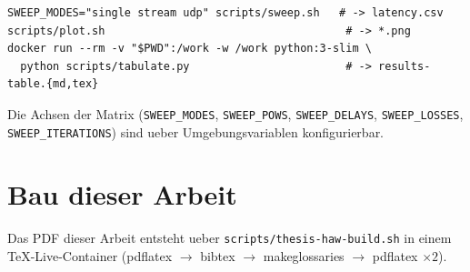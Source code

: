 \begin{lstlisting}[caption={Sweep, Abbildungen und Tabellen.}]
SWEEP_MODES="single stream udp" scripts/sweep.sh   # -> latency.csv
scripts/plot.sh                                     # -> *.png
docker run --rm -v "$PWD":/work -w /work python:3-slim \
  python scripts/tabulate.py                        # -> results-table.{md,tex}
\end{lstlisting}

Die Achsen der Matrix (\texttt{SWEEP\_MODES}, \texttt{SWEEP\_POWS},
\texttt{SWEEP\_DELAYS}, \texttt{SWEEP\_LOSSES}, \texttt{SWEEP\_ITERATIONS}) sind
ueber Umgebungsvariablen konfigurierbar.

\section{Bau dieser Arbeit}
\label{app:repro-thesis}

Das PDF dieser Arbeit entsteht ueber \texttt{scripts/thesis-haw-build.sh} in
einem \TeX{}-Live-Container (pdflatex $\rightarrow$ bibtex $\rightarrow$
makeglossaries $\rightarrow$ pdflatex $\times 2$).

